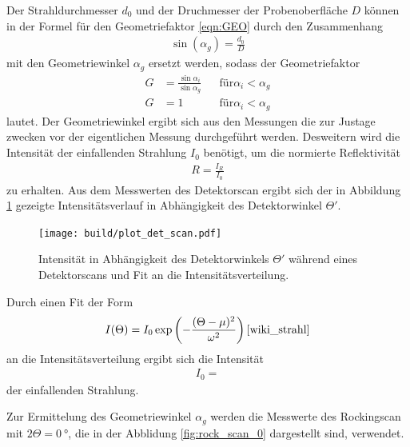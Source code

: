 Der Strahldurchmesser $d_0$ und der Druchmesser der Probenoberfläche $D$ können in der Formel für den Geometriefaktor \eqref{eqn:GEO}
durch den Zusammenhang
\begin{align}
   \sin(\alpha_g) = \frac{d_0}{D}
\end{align}
mit den Geometriewinkel $\alpha_g$ ersetzt werden, sodass der Geometriefaktor
\begin{align}
  G&=\frac{\sin\alpha_i}{\sin\alpha_g} &  &\text{für} \alpha_i<\alpha_g \label{eqn:GEO_neu}\\
  G&=1 & &\text{für} \alpha_i<\alpha_g
\end{align}
lautet.
Der Geometriewinkel ergibt sich aus den Messungen die zur Justage zwecken vor der eigentlichen Messung durchgeführt werden.
Desweitern wird die Intensität der einfallenden Strahlung $I_0$ benötigt, um die normierte Reflektivität
\begin{align}
  R=\frac{I_R}{I_0}
\end{align}
zu erhalten.
Aus dem Messwerten des Detektorscan ergibt sich der in Abbildung \ref{fig:det_scan}
gezeigte Intensitätsverlauf in Abhängigkeit des Detektorwinkel $\Theta'$.

\begin{figure}
  \centering
  \texttt{[image: build/plot\_det\_scan.pdf]}
  \caption{Intensität in Abhängigkeit des Detektorwinkels $\Theta'$ während eines Detektorscans und Fit an die Intensitätsverteilung.}
  \label{fig:det_scan}
\end{figure}

Durch einen Fit der Form
\begin{align}
  I(\Theta) =  I_0 \exp\left(-\frac{(\Theta-\mu)^2}{\omega^2}\right) \text{\cite{wiki_strahl}}
\end{align}
an die Intensitätsverteilung ergibt sich die Intensität
\begin{align}
  I_0 = \label{eqn:I_0}
\end{align}
der einfallenden Strahlung.

Zur Ermittelung des Geometriewinkel  $\alpha_g$ werden die Messwerte
des Rockingscan mit $2\Theta = \SI{0}{\degree}$, die in der Abblidung \ref{fig:rock_scan_0}
dargestellt sind, verwendet.


